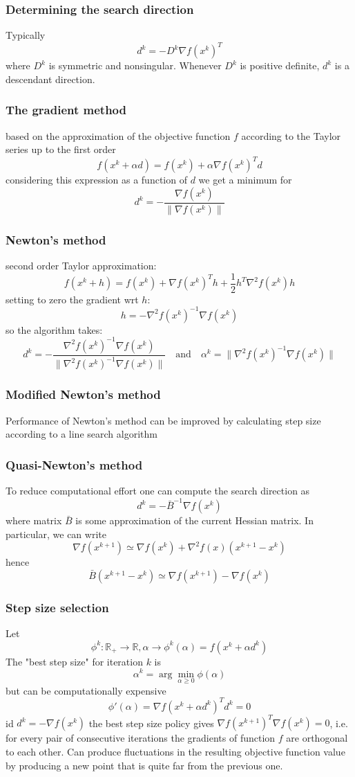 \documentclass{book}
\newcommand{\R}{\mathbb{R}}
\theoremstyle{theoremv2}
\theoremstyle{defv2}
\theoremstyle{remark}
\theoremstyle{remark}
\begin{document}
\subsubsection{Determining the search direction}
Typically 
\[
    d^k = -D^k \nabla f(x^k)^T
\]
where $D^k$ is symmetric and nonsingular. Whenever $D^k$ is positive definite, $d^k$ is a descendant direction.
\subsubsection{The gradient method}
based on the approximation of the objective function $f$ according to the Taylor series up to the first order
\[
    f(x^k+\alpha d) = f(x^k) + \alpha\nabla f(x^k)^T d
\]
considering this expression as a function of $d$ we get a minimum for 
\[
    d^k = -\displaystyle\frac{\nabla f(x^k)}{\|\nabla f(x^k)\|}
\]
\subsubsection{Newton's method}
second order Taylor approximation:
\[
    f(x^k+h)  = f(x^k) + \nabla f(x^k)^T h +\displaystyle\frac{1}{2}h^T\nabla^2f(x^k)h
\]
setting to zero the gradient wrt $h$: 
\[
    h = -\nabla^2 f(x^k)^{-1}\nabla f(x^k)
\]
so the algorithm takes:
\[
    d^k = -\displaystyle\frac{\nabla^2 f(x^k)^{-1}\nabla f(x^k)}{\|\nabla^2 f(x^k)^{-1}\nabla f(x^k)\|} \quad \text{and} \quad \alpha^k = \|\nabla^2 f(x^k)^{-1}\nabla f(x^k)\|
\]
\subsubsection{Modified Newton's method}
Performance of Newton's method can be improved by calculating step size according to a line search algorithm
\subsubsection{Quasi-Newton's method}
To reduce computational effort one can compute the search direction as 
\[
    d^k = -\bar{B}^{-1}\nabla f(x^k)
\]
where matrix $\bar{B}$ is some approximation of the current Hessian matrix. In particular, we can write
\[
    \nabla f(x^{k+1}) \simeq \nabla f(x^k) + \nabla^2 f(x)(x^{k+1}-x^k)
\]
hence
\[
    \bar{B}(x^{k+1}-x^k) \simeq \nabla f(x^{k+1}) -\nabla f(x^k)
\]
\subsubsection{Step size selection}
Let 
\[
    \phi^k : \R_+\to\R, \alpha\to\phi^k(\alpha) = f(x^k+\alpha d^k)
\]
The "best step size" for iteration $k$ is 
\[
    \alpha^k = \arg \min_{\alpha\geq 0} \phi(\alpha)
\]
but can be computationally expensive
\[
    \phi'(\alpha) = \nabla f(x^k +\alpha d^k)^T d^k = 0
\]
id $d^k = -\nabla f(x^k)$ the best step size policy gives $\nabla f(x^{k+1})^T\nabla f(x^k)=0$, i.e. for every pair of consecutive iterations the gradients of function $f$ are orthogonal to each other. Can produce fluctuations in the resulting objective function value by producing a new point that is quite far from the previous one.
\end{document}
